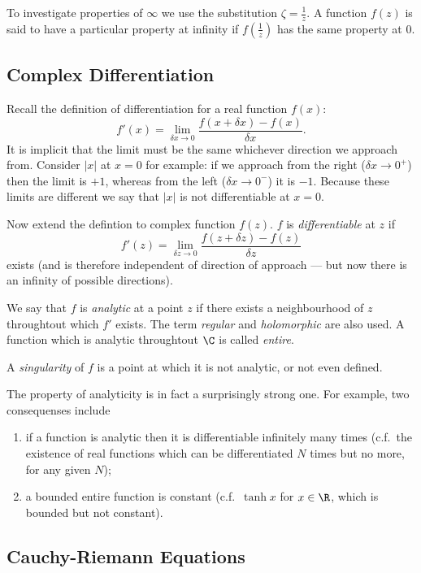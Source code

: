 \documentclass[a4paper]{article}
\begin{document}
To investigate properties of \(\infty\) we use the substitution \(\zeta = \frac{1}{z}\). A function \(f(z)\) is said to have a particular property at infinity if \(f(\frac{1}{z})\) has the same property at \(0\).

\subsection{Complex Differentiation}

Recall the definition of differentiation for a real function \(f(x)\):
\[
  f'(x) = \lim_{\delta x \to 0} \frac{f(x + \delta x) - f(x)}{\delta x}.
\]
It is implicit that the limit must be the same whichever direction we approach from. Consider \(|x|\) at \(x = 0\) for example: if we approach from the right (\(\delta x \to 0^+\)) then the limit is \(+1\), whereas from the left (\(\delta x \to 0^-\)) it is \(-1\). Because these limits are different we say that \(|x|\) is not differentiable at \(x = 0\).

Now extend the defintion to complex function \(f(z)\). \(f\) is \emph{differentiable} at \(z\) if
\[
  f'(z) = \lim_{\delta z \to 0} \frac{f(z + \delta z) - f(z)}{\delta z}
\]
exists (and is therefore independent of direction of approach --- but now there is an infinity of possible directions).

We say that \(f\) is \emph{analytic} at a point \(z\) if there exists a neighbourhood of \(z\) throughtout which \(f'\) exists. The term \emph{regular} and \emph{holomorphic} are also used. A function which is analytic throughtout \(\C\) is called \emph{entire}.

A \emph{singularity} of \(f\) is a point at which it is not analytic, or not even defined.

The property of analyticity is in fact a surprisingly strong one. For example, two consequenses include
\begin{enumerate}
\item if a function is analytic then it is differentiable infinitely many times (c.f.\ the existence of real functions which can be differentiated \(N\) times but no more, for any given \(N\));
\item a bounded entire function is constant (c.f.\ \(\tanh x\) for \(x \in \R\), which is bounded but not constant).
\end{enumerate}

\subsection{Cauchy-Riemann Equations}
\end{document}
